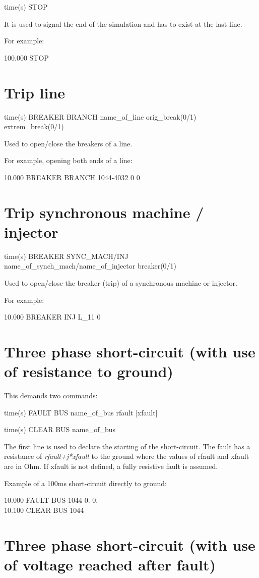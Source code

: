 time(s) STOP 

It is used to signal the end of the simulation and has to exist at the last line. 

For example:

100.000 STOP 

\section{Trip line}

time(s) BREAKER BRANCH name\_of\_line orig\_break(0/1)
	extrem\_break(0/1) 
	
Used to open/close the breakers of a line. 

For example, opening both ends of a line:

10.000 BREAKER BRANCH 1044-4032 0 0 

\section{Trip synchronous machine / injector}

time(s) BREAKER SYNC\_MACH/INJ name\_of\_synch\_mach/name\_of\_injector
	breaker(0/1) 
	
Used to open/close the breaker (trip) of a synchronous machine or injector. 

For example:

10.000 BREAKER INJ L\_11 0 

\section{Three phase short-circuit (with use of resistance to
	ground)}

This demands two commands:

time(s) FAULT BUS name\_of\_bus rfault {[}xfault{]}
	
time(s) CLEAR BUS name\_of\_bus

The first line is used to declare the starting of the short-circuit.
The fault has a resistance of \emph{rfault+j{*}xfault} to the ground
where the values of rfault and xfault are in Ohm. If xfault is not
defined, a fully resistive fault is assumed.

Example of a 100ms short-circuit directly to ground:

10.000 FAULT BUS 1044 0. 0.\\
10.100 CLEAR BUS 1044
	

\section{Three phase short-circuit (with use of voltage reached
	after fault)}

